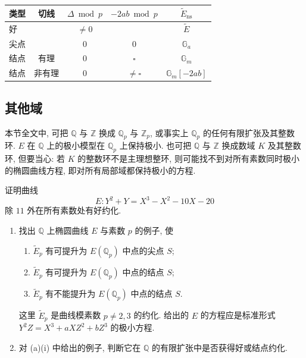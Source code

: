 \begin{center}
\renewcommand{\arraystretch}{1.35}
\begin{tabular}{lcccc}
\hline
类型 & 切线 & $\Delta\bmod p$ & $-2ab\bmod p$ & $\tilde{E}_{\mathrm{ns}}$\\
\hline
好 & & $\neq 0$ & & $\tilde{E}$\\
尖点 & & $0$ & $0$ & $\mathbb{G}_a$\\
结点 & 有理 & $0$ & $\square$ & $\mathbb{G}_m$\\
结点 & 非有理 & $0$ & $\neq\square$ & $\mathbb{G}_m[-2ab]$\\
\hline
\end{tabular}
\end{center}

\subsection*{其他域}

本节全文中, 可把 $\mathbb{Q}$ 与 $\mathbb{Z}$ 换成 $\mathbb{Q}_p$ 与 $\mathbb{Z}_p$, 或事实上 $\mathbb{Q}_p$ 的任何有限扩张及其整数环. $E$ 在 $\mathbb{Q}$ 上的极小模型在 $\mathbb{Q}_p$ 上保持极小. 也可把 $\mathbb{Q}$ 与 $\mathbb{Z}$ 换成数域 $K$ 及其整数环, 但要当心: 若 $K$ 的整数环不是主理想整环, 则可能找不到对所有素数同时极小的椭圆曲线方程, 即对所有局部域都保持极小的方程.

\begin{exercise} \label{thm:2.3.2} 
证明曲线
\[
E\colon Y^2 + Y = X^3 - X^2 - 10X - 20
\]
除 $11$ 外在所有素数处有好约化.
\end{exercise}

\begin{exercise} \label{thm:2.3.3} 
\begin{enumerate}[label=\textup{(\alph*)}]
\item 找出 $\mathbb{Q}$ 上椭圆曲线 $E$ 与素数 $p$ 的例子, 使
\begin{enumerate}[label=\textup{(\roman*)}]
\item $\tilde{E}_p$ 有可提升为 $E(\mathbb{Q}_p)$ 中点的尖点 $S$;
\item $\tilde{E}_p$ 有可提升为 $E(\mathbb{Q}_p)$ 中点的结点 $S$;
\item $\tilde{E}_p$ 有不能提升为 $E(\mathbb{Q}_p)$ 中点的结点 $S$.
\end{enumerate}
这里 $\tilde{E}_p$ 是曲线模素数 $p\neq 2,3$ 的约化. 给出的 $E$ 的方程应是标准形式 $Y^2Z = X^3 + aXZ^2 + bZ^3$ 的极小方程.
\item 对 (a)(i) 中给出的例子, 判断它在 $\mathbb{Q}$ 的有限扩张中是否获得好或结点约化.
\end{enumerate}
\end{exercise}

